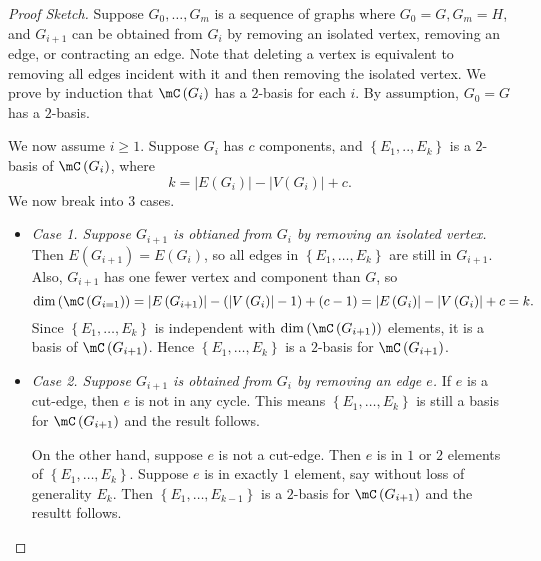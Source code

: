\documentclass[co342]{subfiles}
\begin{document}
    \begin{proof}[Proof Sketch]
        Suppose $G_0,\ldots,G_m$ is a sequence of graphs where $G_0=G, G_m=H$, and $G_{i+1}$ can be obtained from $G_i$ by removing an isolated vertex, removing an edge, or contracting an edge. Note that deleting a vertex is equivalent to removing all edges incident with it and then removing the isolated vertex. We prove by induction that $\mC\left( G_i \right)$ has a $2$-basis for each $i$. By assumption, $G_0=G$ has a $2$-basis.

        We now assume $i\geq 1$. Suppose $G_i$ has $c$ components, and $\left\lbrace E_1,..,E_k \right\rbrace$ is a $2$-basis of $\mC\left( G_i \right)$, where
        \begin{equation*}
            k = \left| E\left( G_i \right) \right|-\left| V\left( G_i \right) \right|+c.
        \end{equation*}
        We now break into $3$ cases.
        \begin{itemize}
            \item \textit{Case 1. Suppose $G_{i+1}$ is obtianed from $G_i$ by removing an isolated vertex.} Then $E\left( G_{i+1} \right)=E\left( G_i \right)$, so all edges in $\left\lbrace E_1,\ldots,E_k \right\rbrace$ are still in $G_{i+1}$. Also, $G_{i+1}$ has one fewer vertex and component than $G$, so
                \begin{equation*}
                    \dim\left( \mC\left( G_{i=1} \right) \right) = \left| E\left( G_{i+1} \right) \right| - \left( \left| V\left( G_i \right) \right|-1 \right)+\left( c-1 \right) = \left| E\left( G_i \right) \right|-\left| V\left( G_i \right) \right|+c = k.
                \end{equation*}
                Since $\left\lbrace E_1,\ldots,E_k \right\rbrace$ is independent with $\dim\left( \mC\left( G_{i+1} \right) \right)$ elements, it is a basis of $\mC\left( G_{i+1} \right)$. Hence $\left\lbrace E_1,\ldots,E_k \right\rbrace$ is a $2$-basis for $\mC\left( G_{i+1} \right)$.

            \item \textit{Case 2. Suppose $G_{i+1}$ is obtained from $G_i$ by removing an edge $e$.} If $e$ is a cut-edge, then $e$ is not in any cycle. This means $\left\lbrace E_1,\ldots,E_k \right\rbrace$ is still a basis for $\mC\left( G_{i+1} \right)$ and the result follows. 

                On the other hand, suppose $e$ is not a cut-edge. Then $e$ is in $1$ or $2$ elements of $\left\lbrace E_1,\ldots,E_k \right\rbrace$. Suppose $e$ is in exactly $1$ element, say without loss of generality $E_k$. Then $\left\lbrace E_1,\ldots,E_{k-1} \right\rbrace$ is a $2$-basis for $\mC\left( G_{i+1} \right)$ and the resultt follows.


\end{itemize}
\end{proof}
\end{document}
